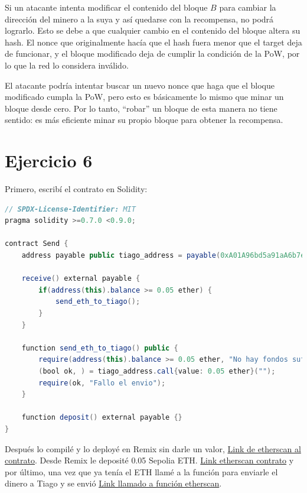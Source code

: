 \documentclass[12pt]{article}
\begin{document}
Si un atacante intenta modificar el contenido del bloque $B$ para cambiar la dirección del minero a la suya y así quedarse con la recompensa, no podrá lograrlo. Esto se debe a que cualquier cambio en el contenido del bloque altera su hash. El nonce que originalmente hacía que el hash fuera menor que el target deja de funcionar, y el bloque modificado deja de cumplir la condición de la PoW, por lo que la red lo considera inválido.

El atacante podría intentar buscar un nuevo nonce que haga que el bloque modificado cumpla la PoW, pero esto es básicamente lo mismo que minar un bloque desde cero. Por lo tanto, “robar” un bloque de esta manera no tiene sentido: es más eficiente minar su propio bloque para obtener la recompensa.

\section*{Ejercicio 6}

Primero, escribí el contrato en Solidity:

\begin{lstlisting}[language=Java]
// SPDX-License-Identifier: MIT
pragma solidity >=0.7.0 <0.9.0;

contract Send {
    address payable public tiago_address = payable(0xA01A96bd5a91aA6b7e3CA90323Cb2aCE80ca4B09);

    receive() external payable {
        if(address(this).balance >= 0.05 ether) {
            send_eth_to_tiago();
        }
    }

    function send_eth_to_tiago() public {
        require(address(this).balance >= 0.05 ether, "No hay fondos suficientes");
        (bool ok, ) = tiago_address.call{value: 0.05 ether}("");
        require(ok, "Fallo el envio");
    }

    function deposit() external payable {}
}
\end{lstlisting}

Después lo compilé y lo deployé en Remix sin darle un valor, \href{https://sepolia.etherscan.io/address/0x6901def5a7b5d868d9ae257d8b48c1b54521d265}{Link de etherscan al contrato}. Desde Remix le deposité 0.05 Sepolia ETH. \href{https://sepolia.etherscan.io/tx/0xe11dc3fc515397587921a24b65f426afc68ae0ffca2c91c83c3dcde5b597be78}{Link etherscan contrato} y por último, una vez que ya tenía el ETH llamé a la función para enviarle el dinero a Tiago y se envió \href{https://sepolia.etherscan.io/tx/0x905e69f5895835a7d94b7b0a0e4f8cfaf6129e490c537745b8fc60e849ddef21}{Link llamado a función etherscan}.
\end{document}
